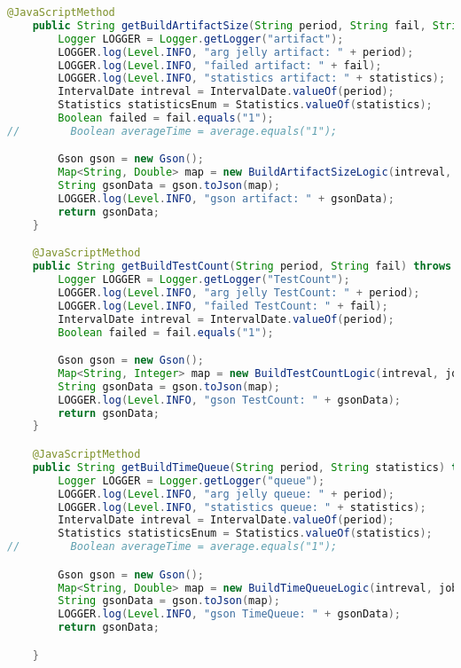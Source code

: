 \begin{lstlisting}[language=Java]
    @JavaScriptMethod
    public String getBuildArtifactSize(String period, String fail, String statistics) throws ParseException {
        Logger LOGGER = Logger.getLogger("artifact");
        LOGGER.log(Level.INFO, "arg jelly artifact: " + period);
        LOGGER.log(Level.INFO, "failed artifact: " + fail);
        LOGGER.log(Level.INFO, "statistics artifact: " + statistics);
        IntervalDate intreval = IntervalDate.valueOf(period);
        Statistics statisticsEnum = Statistics.valueOf(statistics);
        Boolean failed = fail.equals("1");
//        Boolean averageTime = average.equals("1");

        Gson gson = new Gson();
        Map<String, Double> map = new BuildArtifactSizeLogic(intreval, failed, job.getBuilds()).getArtifactSize(statisticsEnum);
        String gsonData = gson.toJson(map);
        LOGGER.log(Level.INFO, "gson artifact: " + gsonData);
        return gsonData;
    }

    @JavaScriptMethod
    public String getBuildTestCount(String period, String fail) throws ParseException {
        Logger LOGGER = Logger.getLogger("TestCount");
        LOGGER.log(Level.INFO, "arg jelly TestCount: " + period);
        LOGGER.log(Level.INFO, "failed TestCount: " + fail);
        IntervalDate intreval = IntervalDate.valueOf(period);
        Boolean failed = fail.equals("1");

        Gson gson = new Gson();
        Map<String, Integer> map = new BuildTestCountLogic(intreval, job.getBuilds()).getTestCount();
        String gsonData = gson.toJson(map);
        LOGGER.log(Level.INFO, "gson TestCount: " + gsonData);
        return gsonData;
    }

    @JavaScriptMethod
    public String getBuildTimeQueue(String period, String statistics) throws ParseException {
        Logger LOGGER = Logger.getLogger("queue");
        LOGGER.log(Level.INFO, "arg jelly queue: " + period);
        LOGGER.log(Level.INFO, "statistics queue: " + statistics);
        IntervalDate intreval = IntervalDate.valueOf(period);
        Statistics statisticsEnum = Statistics.valueOf(statistics);
//        Boolean averageTime = average.equals("1");

        Gson gson = new Gson();
        Map<String, Double> map = new BuildTimeQueueLogic(intreval, job.getBuilds()).getTimeQueue(statisticsEnum);
        String gsonData = gson.toJson(map);
        LOGGER.log(Level.INFO, "gson TimeQueue: " + gsonData);
        return gsonData;

    }


\end{lstlisting}
